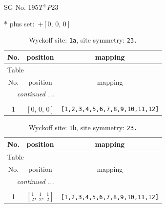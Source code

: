 \documentclass[fleqn,8pt]{jsarticle}
\begin{document}
\setcounter{MaxMatrixCols}{32}

\renewcommand{\tablename}{Table~}
\renewcommand{\figurename}{Figure~}
\begin{center}
\LARGE
SG No. 195\quad$T_{\rm }^{1}$\quad$P23$\quad[ cubic ]
\end{center}
* plus set:\,\,\,$+\left[ 0,\, 0,\, 0 \right]$
\renewcommand{\arraystretch}{1.2}
\begin{longtable}{ccc}
\caption{Wyckoff site: {\tt 1a}, site symmetry: {\tt 23.}}
 \\
 \hline \hline
No. & position & mapping \\ \hline \endfirsthead

\multicolumn{2}{l}{\tablename\ \thetable{}} \\
 \hline \hline
No. & position & mapping \\ \hline \endhead

 \hline \hline
\multicolumn{2}{r}{\footnotesize\it continued ...} \\ \endfoot

 \hline \hline
\multicolumn{2}{r}{} \\ \endlastfoot

1 & $\left[ 0,\, 0,\, 0 \right]$ & {\tt [1,2,3,4,5,6,7,8,9,10,11,12]} \\
\end{longtable}
\renewcommand{\arraystretch}{1.2}
\begin{longtable}{ccc}
\caption{Wyckoff site: {\tt 1b}, site symmetry: {\tt 23.}}
 \\
 \hline \hline
No. & position & mapping \\ \hline \endfirsthead

\multicolumn{2}{l}{\tablename\ \thetable{}} \\
 \hline \hline
No. & position & mapping \\ \hline \endhead

 \hline \hline
\multicolumn{2}{r}{\footnotesize\it continued ...} \\ \endfoot

 \hline \hline
\multicolumn{2}{r}{} \\ \endlastfoot

1 & $\left[ \frac{1}{2},\, \frac{1}{2},\, \frac{1}{2} \right]$ & {\tt [1,2,3,4,5,6,7,8,9,10,11,12]} \\
\end{longtable}
\renewcommand{\arraystretch}{1.2}
\end{document}
